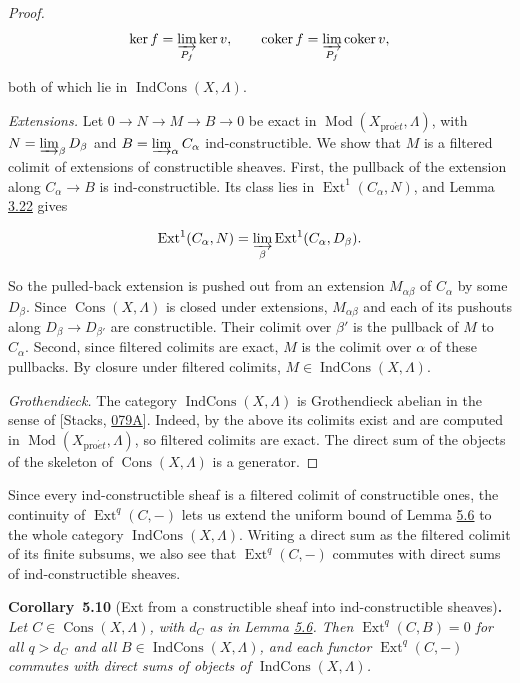 \documentclass[11pt]{article}
\newenvironment{bpstatement}[2]{\par\addvspace{0.6\baselineskip}\noindent\textbf{#1}#2\textbf{.}\enspace\ignorespaces}
  {\par\addvspace{0.4\baselineskip}}
\newenvironment{bpstatementit}[2]{\begin{bpstatement}{#1}{#2}\itshape\ignorespaces}{\end{bpstatement}}
\providecommand{\Cons}{}\renewcommand{\Cons}{\operatorname{Cons}}
\providecommand{\Ext}{}\renewcommand{\Ext}{\operatorname{Ext}}
\providecommand{\IndCons}{}\renewcommand{\IndCons}{\operatorname{IndCons}}
\providecommand{\coker}{}\renewcommand{\coker}{\operatorname{coker}}
\begin{document}
\begin{proof}[{Proof}]
\[
\ker f=\varinjlim_{P_f}\ker v,\qquad
\coker f=\varinjlim_{P_f}\coker v,
\]

both of which lie in \(\IndCons(X,\Lambda)\).

\emph{Extensions.} Let \(0\to N\to M\to B\to0\) be exact in \(\operatorname{Mod}(X_{\mathrm{pro}\acute{e}t},\Lambda)\), with \(N=\varinjlim_\beta D_\beta\) and \(B=\varinjlim_\alpha C_\alpha\) ind-constructible. We show that \(M\) is a filtered colimit of extensions of constructible sheaves. First, the pullback of the extension along \(C_\alpha\to B\) is ind-constructible. Its class lies in \(\Ext^1(C_\alpha,N)\), and Lemma \hyperref[bp260]{3.22} gives

\[
\Ext^1(C_\alpha,N)
=\varinjlim_\beta\Ext^1(C_\alpha,D_\beta).
\]

So the pulled-back extension is pushed out from an extension \(M_{\alpha\beta}\) of \(C_\alpha\) by some \(D_\beta\). Since \(\Cons(X,\Lambda)\) is closed under extensions, \(M_{\alpha\beta}\) and each of its pushouts along \(D_\beta\to D_{\beta'}\) are constructible. Their colimit over \(\beta'\) is the pullback of \(M\) to \(C_\alpha\). Second, since filtered colimits are exact, \(M\) is the colimit over \(\alpha\) of these pullbacks. By closure under filtered colimits, \(M\in\IndCons(X,\Lambda)\).

\emph{Grothendieck.} The category \(\IndCons(X,\Lambda)\) is Grothendieck abelian in the sense of [Stacks, \href{https://stacks.math.columbia.edu/tag/079A}{079A}]. Indeed, by the above its colimits exist and are computed in \(\operatorname{Mod}(X_{\mathrm{pro}\acute{e}t},\Lambda)\), so filtered colimits are exact. The direct sum of the objects of the skeleton of \(\Cons(X,\Lambda)\) is a generator.
\end{proof}

\label{bp435}%
Since every ind-constructible sheaf is a filtered colimit of constructible ones, the continuity of \(\Ext^q(C,-)\) lets us extend the uniform bound of Lemma \hyperref[bp426]{5.6} to the whole category \(\IndCons(X,\Lambda)\). Writing a direct sum as the filtered colimit of its finite subsums, we also see that \(\Ext^q(C,-)\) commutes with direct sums of ind-constructible sheaves.

\label{bp436}%
\begin{bpstatementit}{Corollary~5.10}{ (Ext from a constructible sheaf into ind-constructible sheaves)}
Let \(C\in\Cons(X,\Lambda)\), with \(d_C\) as in Lemma \hyperref[bp426]{5.6}. Then \(\Ext^q(C,B)=0\) for all \(q>d_C\) and all \(B\in\IndCons(X,\Lambda)\), and each functor \(\Ext^q(C,-)\) commutes with direct sums of objects of \(\IndCons(X,\Lambda)\).
\end{bpstatementit}
\end{document}
